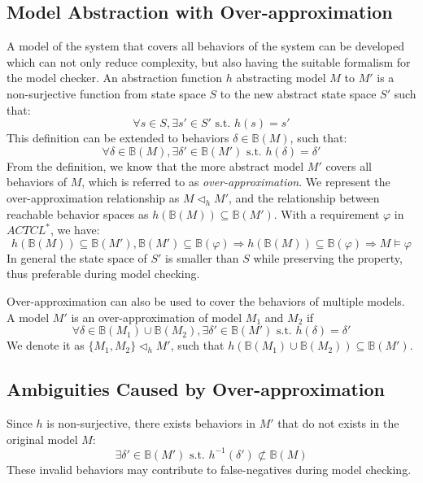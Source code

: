 \subsection{Model Abstraction with Over-approximation}
\label{overapx}
A model of the system that covers all behaviors of the system can be developed which can not only reduce complexity, but also having the suitable formalism for the model checker. An abstraction function $h$ abstracting model $M$ to $M'$ is a non-surjective function from state space $S$ to the new abstract state space $S'$ such that: 
$$\forall s\in S, \exists s'\in S' \text{ s.t. } h(s)=s'$$
This definition can be extended to behaviors $\delta\in \mathbb{B}(M)$, such that:
$$\forall \delta\in \mathbb{B}(M),\exists \delta'\in\mathbb{B}(M')\text{ s.t. } h(\delta)=\delta'$$
From the definition, we know that the more abstract model $M'$ covers all behaviors of $M$, which is referred to as \emph{over-approximation}. We represent the over-approximation relationship as $M\triangleleft_h M'$, and the relationship between reachable behavior spaces as $h(\mathbb{B}(M))\subseteq\mathbb{B}(M')$. With a requirement $\varphi$ in $ACTCL^*$, we have:
$$h(\mathbb{B}(M))\subseteq \mathbb{B}(M'),\mathbb{B}(M')\subseteq \mathbb{B}(\varphi)\Rightarrow h(\mathbb{B}(M))\subseteq \mathbb{B}(\varphi)\Rightarrow M\models\varphi$$
In general the state space of $S'$ is smaller than $S$ while preserving the property, thus preferable during model checking. 

Over-approximation can also be used to cover the behaviors of multiple models. A model $M'$ is an over-approximation of model $M_1$ and $M_2$ if 
$$\forall \delta\in \mathbb{B}(M_1)\cup\mathbb{B}(M_2),\exists \delta'\in\mathbb{B}(M')\text{ s.t. } h(\delta)=\delta'$$
We denote it as $\{M_1,M_2\}\triangleleft_h M'$, such that $h(\mathbb{B}(M_1)\cup\mathbb{B}(M_2))\subseteq\mathbb{B}(M')$.

%

\subsection{Ambiguities Caused by Over-approximation}
Since $h$ is non-surjective, there exists behaviors in $M'$ that do not exists in the original model $M$:
$$\exists\delta'\in\mathbb{B}(M')\text{ s.t. }h^{-1}(\delta')\not\subset\mathbb{B}(M)$$
These invalid behaviors may contribute to false-negatives during model checking.

